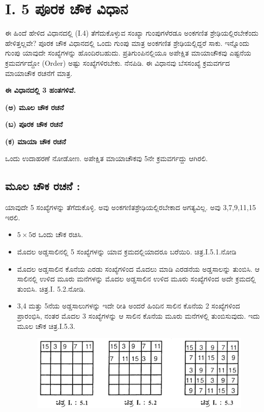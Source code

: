 \section*{I. 5 ಪೂರಕ ಚೌಕ ವಿಧಾನ}

ಈ ಹಿಂದೆ ಹೇಳಿದ ವಿಧಾನದಲ್ಲಿ (I.4) ತೆಗೆದುಕೊಳ್ಳುವ ಸಂಖ್ಯಾ ಗುಂಪುಗಳೆರಡೂ ಅಂಕಗಣಿತ ಶ್ರೇಢಿಯಲ್ಲಿರಬೇಕೆಂದು ಹೇಳಿತ್ತಲ್ಲವೇ? ಪೂರಕ ಚೌಕ ವಿಧಾನದಲ್ಲಿ ಒಂದು ಗುಂಪು ಮಾತ್ರ ಅಂಕಗಣಿತ ಶ್ರೇಢಿಯಲ್ಲಿದ್ದರೆ ಸಾಕು. ಇನ್ನೊಂದು ಗುಂಪು ಯಾವುದೇ ಸಂಖ್ಯೆಗಳನ್ನು ಹೊಂದಿರಬಹುದು. ಪ್ರತಿಗುಂಪಿನಲ್ಲಿಯೂ ಅಪೇಕ್ಷಿತ ಮಾಯಾಚೌಕವು ಎಷ್ಟನೆಯ ಕ್ರಮವರ್ಗದ್ದೋ (Order) ಅಷ್ಟು ಸಂಖ್ಯೆಗಳಿರಬೇಕು. ನೆನಪಿಡಿ. ಈ ವಿಧಾನವು ಬೆಸಸಂಖ್ಯೆ ಕ್ರಮವರ್ಗದ ಮಾಯಾಚೌಕ ರಚನೆಗೆ ಮಾತ್ರ.

\medskip
\textbf{ಈ ವಿಧಾನದಲ್ಲಿ 3 ಹಂತಗಳಿವೆ.}\smallskip

\textbf{(ಅ) ಮೂಲ ಚೌಕ ರಚನೆ}

\textbf{(ಬ) ಪೂರಕ ಚೌಕ ರಚನೆ}

\textbf{(ಕ) ಮಾಯಾ ಚೌಕ ರಚನೆ}

\medskip
ಒಂದು ಉದಾಹರಣೆ ನೋಡೋಣ. ಅಪೇಕ್ಷಿತ ಮಾಯಾಚೌಕವು 5ನೇ ಕ್ರಮವರ್ಗದ್ದು ಆಗಿರಲಿ.

\bigskip
\subsection*{ಮೂಲ ಚೌಕ ರಚನೆ :}

ಯಾವುದೇ 5 ಸಂಖ್ಯೆಗಳನ್ನು ತೆಗೆದುಕೊಳ್ಳಿ. ಅವು ಅಂಕಗಣಿತಶ್ರೇಢಿಯಲ್ಲಿರಬೇಕಾದ ಅಗತ್ಯ\-ವಿಲ್ಲ. ಅವು 3,7,9,11,15 ಇರಲಿ.
\medskip

\begin{itemize}
	\item $5 \times 5$ರ ಒಂದು ಚೌಕ ರಚಿಸಿ.
	\medskip

	\item ಮೊದಲ ಅಡ್ಡಸಾಲಿನಲ್ಲಿ 5 ಸಂಖ್ಯೆಗಳನ್ನು ಯಾವ ಕ್ರಮದಲ್ಲಿಯಾದರೂ ಬರೆಯಿರಿ. ಚಿತ್ರ.I.5.1.ನೋಡಿ
	\medskip

	\item ಮೊದಲ ಅಡ್ಡಸಾಲಿನ ಕೊನೆಯ ಎರಡು ಸಂಖ್ಯೆಗಳಿಂದ ಮೊದಲು ಮಾಡಿ ಎರಡನೆಯ ಅಡ್ಡಸಾಲನ್ನು ತುಂಬಿಸಿ. ಆ ಸಾಲಿನಲ್ಲಿ ಉಳಿದ ಮೂರು ಮನೆಗಳನ್ನು ಮೊದಲ ಅಡ್ಡಸಾಲಿನ ಉಳಿದ ಮೂರು ಸಂಖ್ಯೆಗಳಿಂದ ಅದೇ ಕ್ರಮದಲ್ಲಿ ತುಂಬಿಸಿ. ಚಿತ್ರ.I. 5.2.ನೋಡಿ.
	\medskip

	\item 3,4 ಮತ್ತು 5ನೆಯ ಅಡ್ಡಸಾಲುಗಳನ್ನು ಇದೇ ರೀತಿ ಅಂದರೆ ಹಿಂದಿನ ಸಾಲಿನ ಕೊನೆಯ 2 ಸಂಖ್ಯೆಗಳಿಂದ ಪ್ರಾರಂಭಿಸಿ, ನಂತರ ಮೊದಲ 3 ಸಂಖ್ಯೆಗಳನ್ನು ಆ ಸಾಲಿನ ಕೊನೆಯ ಮೂರು ಮನೆಗಳಲ್ಲಿ ತುಂಬಿಸುವುದು. ಇದು ಮೂಲ ಚೌಕ ಚಿತ್ರ.I.5.3.

	\begin{figure}[H]
	\includegraphics[scale=.95]{src/figures/chap3/fig3-11.jpg}
	\end{figure}
\end{itemize}

